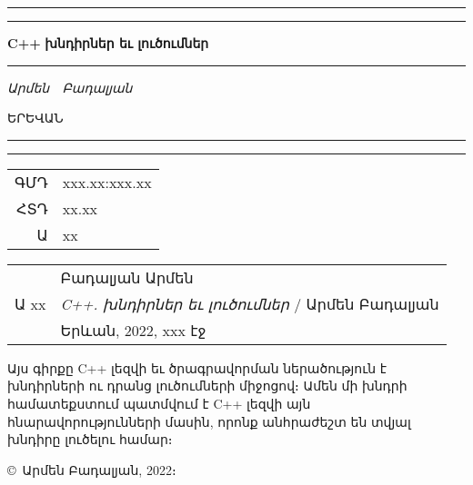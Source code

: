 \begin{titlepage}
\begingroup
\newlength\drop {}\textheight

\rule{\textwidth}{1pt}\par
\vspace{2pt}\vspace{-\baselineskip}
\rule{\textwidth}{0.4pt}\par

\vspace\drop
\centering

{\fontsize{80}{80}\selectfont\textbf{C++}}
\null\vskip12pt\null
{\fontsize{32}{32}\selectfont\textbf{խնդիրներ եւ լուծումներ}}

\vspace{0.25\drop}
\rule{0.3\textwidth}{0.4pt}\par
\vspace{\drop}

{\Large \textit{Արմեն~~Բադալյան}}

\vfill

ԵՐԵՎԱՆ

\MakeUppercase{}

\rule{\textwidth}{0.4pt}\par
\vspace{2pt}\vspace{-\baselineskip}
\rule{\textwidth}{1pt}\par

\endgroup
\end{titlepage}


\begin{titlepage}
\begingroup
\small\sffamily\linespread{1}
\begin{tabular}{rl}
ԳՄԴ & xxx.xx:xxx.xx \\
ՀՏԴ & xx.xx \\
    Ա & xx \\
\end{tabular}
\endgroup

\vskip2cm

\begin{tabular}{rl}
        & Բադալյան Արմեն \\
Ա xx & \textsl{C++. խնդիրներ եւ լուծումներ} / Արմեն Բադալյան \\
        & Երևան, 2022, xxx էջ
\end{tabular}

\begingroup\small
Այս գիրքը C++ լեզվի եւ ծրագրավորման ներածություն է խնդիրների ու դրանց
լուծում\-ների միջոցով։ Ամեն մի խնդրի համատեքստում պատմվում է C++ լեզվի
այն հնարավոր\-ությունների մասին, որոնք անհրաժեշտ են տվյալ խնդիրը լուծելու
համար։
\endgroup

\vfill
\textsf{\copyright\ Արմեն Բադալյան, 2022։}
\end{titlepage}
